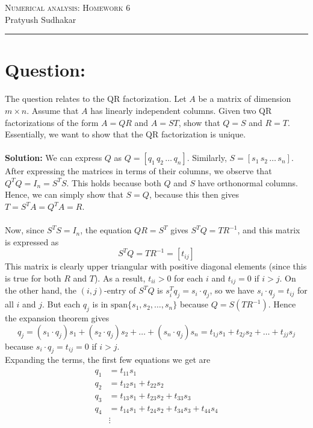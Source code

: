 \documentclass[11pt,onecolumn]{article}
\begin{document}
\noindent
\textsc{\Large Numerical analysis: Homework 6}\\
Pratyush Sudhakar
\\
\vspace{3pt}
\hrule

\section*{Question:}
The question relates to the QR factorization. Let \( A \) be a matrix of dimension \( m \times n \). Assume that \( A \) has linearly independent columns. Given two QR factorizations of the form \( A = QR \) and \( A = ST \), show that \( Q = S \) and \( R = T \). Essentially, we want to show that the QR factorization is unique.
\\
\vspace{1pt}
\\
\textbf{Solution:}
We can express \( Q \) as \( Q = [q_1 \, q_2 \, \ldots \, q_n] \). Similarly, \( S = [s_1 \, s_2 \, \ldots \, s_n] \). After expressing the matrices in terms of their columns, we observe that \( Q^T Q = I_n = S^T S \). This holds because both \( Q \) and \( S \) have orthonormal columns. Hence, we can simply show that \( S = Q \), because this then gives \( T = S^T A = Q^T A = R \).
\\
\vspace{1pt}
\\
Now, since \( S^T S = I_n \), the equation \( QR = S^T \) gives \( S^T Q = T R^{-1} \), and this matrix is expressed as
\[
S^T Q = T R^{-1} = [t_{ij}]
\]
This matrix is clearly upper triangular with positive diagonal elements (since this is true for both \( R \) and \( T \)). As a result, \( t_{ii} > 0 \) for each \( i \) and \( t_{ij} = 0 \) if \( i > j \). On the other hand, the \( (i, j) \)-entry of \( S^T Q \) is \( s_i^T q_j = s_i \cdot q_j \), so we have \( s_i \cdot q_j = t_{ij} \) for all \( i \) and \( j \). But each \( q_j \) is in \( \text{span} \{s_1, s_2, \ldots, s_n\} \) because \( Q = S(T R^{-1}) \). Hence the expansion theorem gives
\[
q_j = (s_1 \cdot q_j) s_1 + (s_2 \cdot q_j) s_2 + \ldots + (s_n \cdot q_j) s_n = t_{1j} s_1 + t_{2j} s_2 + \ldots + t_{jj} s_j
\]
because \( s_i \cdot q_j = t_{ij} = 0 \) if \( i > j \).
\\
Expanding the terms, the first few equations we get are
\[
\begin{aligned}
q_1 &= t_{11} s_1 \\
q_2 &= t_{12} s_1 + t_{22} s_2 \\
q_3 &= t_{13} s_1 + t_{23} s_2 + t_{33} s_3 \\
q_4 &= t_{14} s_1 + t_{24} s_2 + t_{34} s_3 + t_{44} s_4 \\
&\vdots
\end{aligned}
\]
\end{document}
